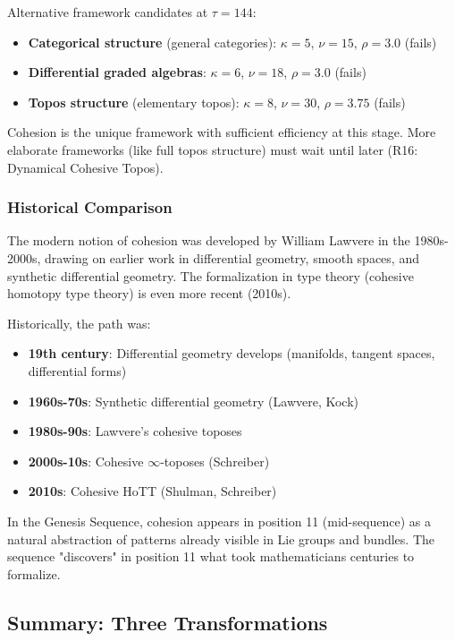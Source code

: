 \documentclass[11pt]{article}
\theoremstyle{definition}
\begin{document}
Alternative framework candidates at $\tau=144$:
\begin{itemize}
\item \textbf{Categorical structure} (general categories): $\kappa=5$, $\nu=15$, $\rho=3.0$ (fails)
\item \textbf{Differential graded algebras}: $\kappa=6$, $\nu=18$, $\rho=3.0$ (fails)
\item \textbf{Topos structure} (elementary topos): $\kappa=8$, $\nu=30$, $\rho=3.75$ (fails)
\end{itemize}

Cohesion is the unique framework with sufficient efficiency at this stage. More elaborate frameworks (like full topos structure) must wait until later (R16: Dynamical Cohesive Topos).

\subsubsection{Historical Comparison}

The modern notion of cohesion was developed by William Lawvere in the 1980s-2000s, drawing on earlier work in differential geometry, smooth spaces, and synthetic differential geometry. The formalization in type theory (cohesive homotopy type theory) is even more recent (2010s).

Historically, the path was:
\begin{itemize}
\item \textbf{19th century}: Differential geometry develops (manifolds, tangent spaces, differential forms)
\item \textbf{1960s-70s}: Synthetic differential geometry (Lawvere, Kock)
\item \textbf{1980s-90s}: Lawvere's cohesive toposes
\item \textbf{2000s-10s}: Cohesive $\infty$-toposes (Schreiber)
\item \textbf{2010s}: Cohesive HoTT (Shulman, Schreiber)
\end{itemize}

In the Genesis Sequence, cohesion appears in position 11 (mid-sequence) as a natural abstraction of patterns already visible in Lie groups and bundles. The sequence "discovers" in position 11 what took mathematicians centuries to formalize.

\subsection{Summary: Three Transformations}
\end{document}
